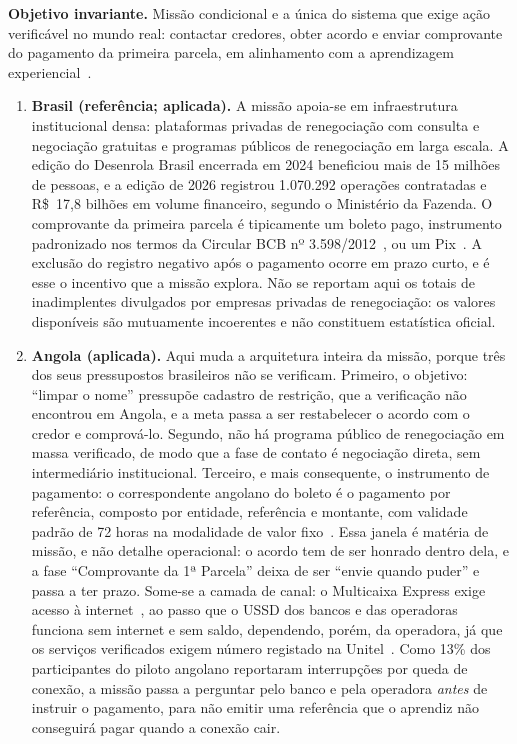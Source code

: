 \noindent\textbf{Objetivo invariante.} Missão condicional e a única do sistema que exige ação verificável no mundo real: contactar credores, obter acordo e enviar comprovante do pagamento da primeira parcela, em alinhamento com a aprendizagem experiencial~\cite{kolb1984}.

\begin{enumerate}
\item[(a)] \textbf{Brasil (referência; aplicada).} A missão apoia-se em infraestrutura institucional densa: plataformas privadas de renegociação com consulta e negociação gratuitas e programas públicos de renegociação em larga escala. A edição do Desenrola Brasil encerrada em 2024 beneficiou mais de 15 milhões de pessoas, e a edição de 2026 registrou 1.070.292 operações contratadas e R\$~17,8 bilhões em volume financeiro, segundo o Ministério da Fazenda. O comprovante da primeira parcela é tipicamente um boleto pago, instrumento padronizado nos termos da Circular BCB nº 3.598/2012~\cite{bcb2012boleto}, ou um Pix~\cite{bcb2020pix}. A exclusão do registro negativo após o pagamento ocorre em prazo curto, e é esse o incentivo que a missão explora. Não se reportam aqui os totais de inadimplentes divulgados por empresas privadas de renegociação: os valores disponíveis são mutuamente incoerentes e não constituem estatística oficial.

\item[(b)] \textbf{Angola (aplicada).} Aqui muda a arquitetura inteira da missão, porque três dos seus pressupostos brasileiros não se verificam. Primeiro, o objetivo: ``limpar o nome'' pressupõe cadastro de restrição, que a verificação não encontrou em Angola, e a meta passa a ser restabelecer o acordo com o credor e comprová-lo. Segundo, não há programa público de renegociação em massa verificado, de modo que a fase de contato é negociação direta, sem intermediário institucional. Terceiro, e mais consequente, o instrumento de pagamento: o correspondente angolano do boleto é o pagamento por referência, composto por entidade, referência e montante, com validade padrão de 72 horas na modalidade de valor fixo~\cite{appypay2026referencia}. Essa janela é matéria de missão, e não detalhe operacional: o acordo tem de ser honrado dentro dela, e a fase ``Comprovante da 1ª Parcela'' deixa de ser ``envie quando puder'' e passa a ter prazo. Some-se a camada de canal: o Multicaixa Express exige acesso à internet~\cite{multicaixa2026faq}, ao passo que o USSD dos bancos e das operadoras funciona sem internet e sem saldo, dependendo, porém, da operadora, já que os serviços verificados exigem número registado na Unitel~\cite{accessbank2026ussd,atlantico2026ussd}. Como 13\% dos participantes do piloto angolano reportaram interrupções por queda de conexão, a missão passa a perguntar pelo banco e pela operadora \emph{antes} de instruir o pagamento, para não emitir uma referência que o aprendiz não conseguirá pagar quando a conexão cair.


\end{enumerate}
